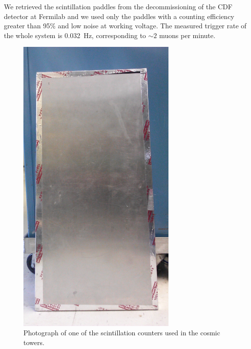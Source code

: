 We retrieved the scintillation paddles from the decommissioning of the CDF detector at Fermilab and we used only the paddles with a counting efficiency greater than 95\% and low noise at working voltage. The measured trigger rate of the whole system is 0.032~Hz, corresponding to $\sim 2$ muons per minute.


\begin{figure}[h!]
\centering
 \includegraphics[angle=90,width=0.7\textwidth]{Chapter-3/Images/Cosmic_Paddle.jpg}
\caption{Photograph of one of the scintillation counters used in the cosmic towers. } 
\label{pic:cosmicpaddle}
\end{figure}





